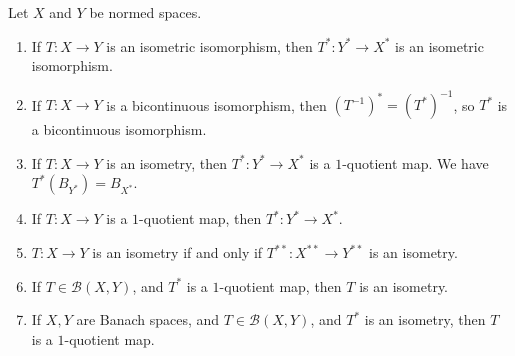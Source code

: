 \documentclass[10pt]{mypackage}
\begin{document}
\begin{theorem}
  Let $X$ and $Y$ be normed spaces.
  \begin{enumerate}[(1)]
    \item If $T: X\rightarrow Y$ is an isometric isomorphism, then $T^{\ast}: Y^{\ast}\rightarrow X^{\ast}$ is an isometric isomorphism.
    \item If $T: X\rightarrow Y$ is a bicontinuous isomorphism, then $\left(T^{-1}\right)^{\ast} = \left(T^{\ast}\right)^{-1}$, so $T^{\ast}$ is a bicontinuous isomorphism.
    \item If $T: X\rightarrow Y$ is an isometry, then $T^{\ast}: Y^{\ast}\rightarrow X^{\ast}$ is a $1$-quotient map. We have $T^{\ast}\left(B_{Y^{\ast}}\right) = B_{X^{\ast}}$.
    \item If $T: X\rightarrow Y$ is a $1$-quotient map, then $T^{\ast}:Y^{\ast}\rightarrow X^{\ast}$.
    \item $T: X\rightarrow Y$ is an isometry if and only if $T^{\ast\ast}: X^{\ast\ast}\rightarrow Y^{\ast\ast}$ is an isometry.
    \item If $T\in \mathcal{B}\left(X,Y\right)$, and $T^{\ast}$ is a $1$-quotient map, then $T$ is an isometry.
    \item If $X,Y$ are Banach spaces, and $T\in \mathcal{B}\left(X,Y\right)$, and $T^{\ast}$ is an isometry, then $T$ is a $1$-quotient map.
  \end{enumerate}
\end{theorem}
\end{document}
